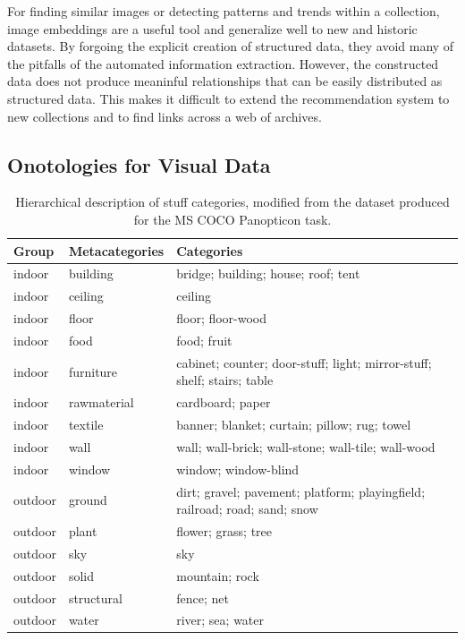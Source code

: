 \documentclass[10pt, a4paper]{article}
\begin{document}
For finding similar images or detecting patterns and trends within a collection,
image embeddings are a useful tool and generalize well to new and historic datasets.
By forgoing the explicit creation of structured data, they avoid many of the
pitfalls of the automated information extraction. However, the constructed data
does not produce meaninful relationships that can be easily distributed as
structured data. This makes it difficult to extend the recommendation system
to new collections and to find links across a web of archives.

\subsection{Onotologies for Visual Data}

\begin{table}[ht!]
\centering
\begin{tabular}{lll}
 \hline
\textbf{Group} & \textbf{Metacategories} & \textbf{Categories} \\
 \hline
indoor & building & bridge; building; house; roof; tent \\
 indoor & ceiling & ceiling \\
 indoor & floor & floor; floor-wood \\
 indoor & food & food; fruit \\
 indoor & furniture & cabinet; counter; door-stuff; light; mirror-stuff; shelf; stairs; table \\
 indoor & rawmaterial & cardboard; paper \\
 indoor & textile & banner; blanket; curtain; pillow; rug; towel \\
 indoor & wall & wall; wall-brick; wall-stone; wall-tile; wall-wood \\
 indoor & window & window; window-blind \\ \hline
 outdoor & ground & dirt; gravel; pavement; platform; playingfield; railroad; road; sand; snow \\
 outdoor & plant & flower; grass; tree \\
 outdoor & sky & sky \\
 outdoor & solid & mountain; rock \\
 outdoor & structural & fence; net \\
 outdoor & water & river; sea; water \\
  \hline
\end{tabular}
\caption{Hierarchical description of stuff categories, modified from the dataset
produced for the MS COCO Panopticon task.}
\label{tab:categories}
\end{table}
\end{document}
